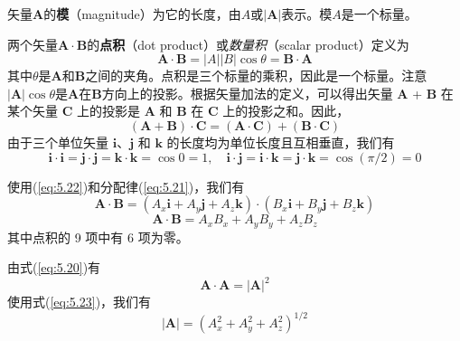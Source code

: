     矢量$\mathbf{A}$的\textbf{模}（magnitude）为它的长度，由$A$或$\left|\mathbf{A}\right|$表示。模$A$是一个标量。

    两个矢量$\mathbf{A}\cdot\mathbf{B}$的\textbf{点积}（dot product）或\textit{数量积}（scalar product）定义为
    \begin{equation}
        \boxed{
            \mathbf{A}\cdot\mathbf{B} = \left|A\right|\left|B\right|\cos\theta = \mathbf{B}\cdot\mathbf{A}
        }
        \label{eq:5.20}
    \end{equation}
    其中$\theta$是$\mathbf{A}$和$\mathbf{B}$之间的夹角。点积是三个标量的乘积，因此是一个标量。注意$\left|\mathbf{A}\right|\cos\theta$是$\mathbf{A}$在$\mathbf{B}$方向上的投影。根据矢量加法的定义，可以得出矢量 $\mathbf{A}$ + $\mathbf{B}$ 在某个矢量 $\mathbf{C}$ 上的投影是 $\mathbf{A}$ 和 $\mathbf{B}$ 在 $\mathbf{C}$ 上的投影之和。因此，
    \begin{equation}
        \left(\mathbf{A} + \mathbf{B}\right)\cdot\mathbf{C} = \left(\mathbf{A}\cdot\mathbf{C}\right) + \left(\mathbf{B}\cdot\mathbf{C}\right)
        \label{eq:5.21}
    \end{equation}
    由于三个单位矢量 $\mathbf{i}$、$\mathbf{j}$ 和 $\mathbf{k}$ 的长度均为单位长度且互相垂直，我们有
    \begin{equation}
        \mathbf{i}\cdot\mathbf{i} = \mathbf{j}\cdot\mathbf{j} = \mathbf{k}\cdot\mathbf{k} = \cos 0 = 1, \quad \mathbf{i}\cdot\mathbf{j} = \mathbf{i}\cdot\mathbf{k} = \mathbf{j}\cdot\mathbf{k} = \cos \left(\pi/2\right) = 0
        \label{eq:5.22}
    \end{equation}

    使用(\ref{eq:5.22})和分配律(\ref{eq:5.21})，我们有
    \begin{equation*}
        \mathbf{A}\cdot\mathbf{B} = \left(A_x\mathbf{i} + A_y\mathbf{j} + A_z\mathbf{k}\right)\cdot\left(B_x\mathbf{i} + B_y\mathbf{j} + B_z\mathbf{k}\right)
    \end{equation*}
    \begin{equation}
        \boxed{
            \mathbf{A}\cdot\mathbf{B} = A_xB_x + A_yB_y + A_zB_z
        }
        \label{eq:5.23}
    \end{equation}
    其中点积的 9 项中有 6 项为零。

    由式(\ref{eq:5.20})有
    \begin{equation}
        \boxed{
            \mathbf{A}\cdot\mathbf{A} = \left|\mathbf{A}\right|^2
        }
        \label{eq:5.24}
    \end{equation}
    使用式(\ref{eq:5.23})，我们有
    \begin{equation}
        \boxed{
            \left|\mathbf{A}\right| = \left(A_x^2 + A_y^2 + A_z^2\right)^{1/2}
        }
        \label{eq:5.25}
    \end{equation}

